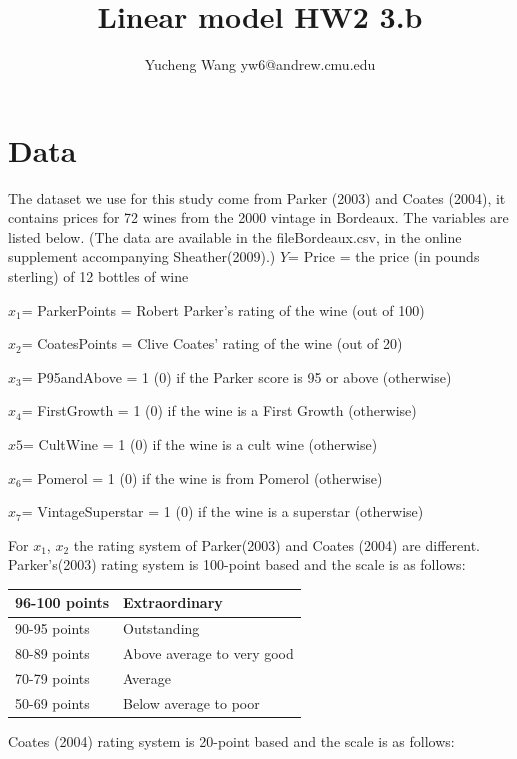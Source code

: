 \documentclass[11pt]{article}
\title{Linear model HW2 3.b}
\author{Yucheng Wang yw6@andrew.cmu.edu}
\date{}
\begin{document}
\maketitle

\section{Data}
The dataset we use for this study come from Parker  (2003)  and  Coates  (2004), it contains prices for 72 wines from the 2000 vintage in Bordeaux. The variables are listed below. (The data are available in the fileBordeaux.csv, in the online supplement accompanying Sheather(2009).)
$Y$=   Price = the price (in pounds sterling) of 12 bottles of wine

$x_1$=   ParkerPoints = Robert Parker’s rating of the wine (out of 100)

$x_2$=   CoatesPoints = Clive Coates’ rating of the wine (out of 20)

$x_3$=   P95andAbove = 1 (0) if the Parker score is 95 or above (otherwise)

$x_4$=   FirstGrowth = 1 (0) if the wine is a First Growth (otherwise)

$x5$=   CultWine = 1 (0) if the wine is a cult wine (otherwise)

$x_6$=   Pomerol = 1 (0) if the wine is from Pomerol (otherwise)

$x_7$=   VintageSuperstar = 1 (0) if the wine is a superstar (otherwise)


For $x_1$, $x_2$ the rating system of Parker(2003) and Coates  (2004) are different.\\ Parker's(2003) rating system is 100-point based and the scale is as follows:
\begin{table}[h]
\begin{tabular}{|l|l|}
\hline
96-100 points & Extraordinary              \\ \hline
90-95 points  & Outstanding                \\ \hline
80-89 points  & Above average to very good \\ \hline
70-79 points  & Average                    \\ \hline
50-69 points  & Below average to poor      \\ \hline
\end{tabular}
\end{table}
Coates  (2004) rating system is 20-point based and the scale is as follows:\\\\\\\\\\\\\\\\\\
\end{document}
